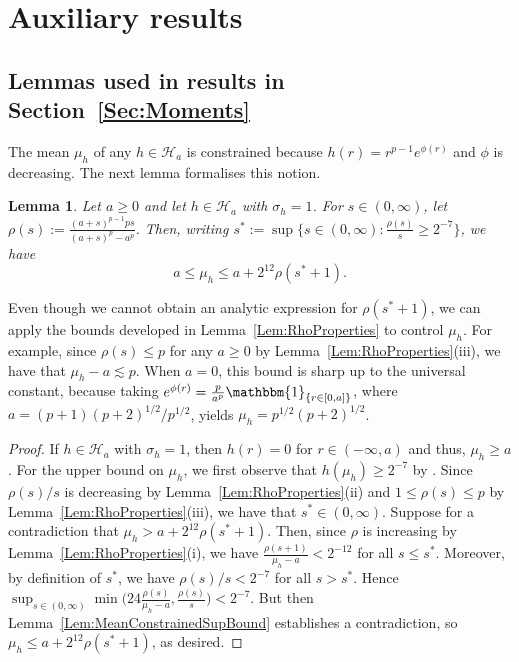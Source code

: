 \documentclass[a4paper,12pt]{article}
\newtheorem{lemma}[theorem]{Lemma}
\newenvironment{remark}[1][Remark:]{\begin{trivlist}
\item[\hskip \labelsep {\bfseries #1}]}{\end{trivlist}}
\begin{document}
\section{Auxiliary results}

\subsection{Lemmas used in results in Section~\ref{Sec:Moments}} 

The mean $\mu_h$ of any $h \in \mathcal{H}_a$ is constrained because $h(r) = r^{p-1}e^{\phi(r)}$ and $\phi$ is decreasing. The next lemma formalises this notion.
\begin{lemma}
  \label{Lem:UnitVarianceMeanBound}
  Let $a \geq 0$ and let $h \in \mathcal{H}_{a}$ with $\sigma_h = 1$.  For $s \in (0,\infty)$, let $\rho(s) := \frac{(a + s)^{p-1} p s}{(a + s)^p - a^p}$.  Then, writing $s^* := \sup \{ s \in (0,\infty) : \frac{\rho(s)}{s} \geq 2^{-7} \}$, we have
\[
a \leq \mu_h \leq a + 2^{12} \rho(s^*+1).
\]
\end{lemma}
\begin{remark}
Even though we cannot obtain an analytic expression for $\rho(s^*+1)$, we can apply the bounds developed in Lemma~\ref{Lem:RhoProperties} to control $\mu_h$.  For example, since $\rho(s) \leq p$ for any $a \geq 0$ by Lemma~\ref{Lem:RhoProperties}(iii), we have that $\mu_h - a \lesssim p$. When $a = 0$, this bound is sharp up to the universal constant, because taking $e^{\phi(r)} = \frac{p}{a^p}\mathbbm{1}_{\{r \in [0,a]\}}$, where $a = (p+1)(p+2)^{1/2}/p^{1/2}$, yields $\mu_h = p^{1/2}(p+2)^{1/2}$. 
\end{remark}
\begin{proof}
If $h \in \mathcal{H}_{a}$ with $\sigma_h = 1$, then $h(r) = 0$ for $r \in (-\infty, a)$ and thus, $\mu_h \geq a$.  For the upper bound on $\mu_h$, we first observe that $h(\mu_h) \geq 2^{-7}$ by \citet[][Theorem~5.14(d)]{lovasz2007geometry}.  Since $\rho(s)/s$ is decreasing by Lemma~\ref{Lem:RhoProperties}(ii) and $1 \leq \rho(s) \leq p$ by Lemma~\ref{Lem:RhoProperties}(iii), we have that $s^* \in (0,\infty)$.  Suppose for a contradiction that $\mu_h > a + 2^{12}\rho(s^*+1)$.  Then, since $\rho$ is increasing  by Lemma~\ref{Lem:RhoProperties}(i), we have $\frac{\rho(s + 1)}{\mu_h - a} < 2^{-12}$ for all $s \leq s^*$. Moreover, by definition of $s^*$, we have $\rho(s)/s < 2^{-7}$ for all $s > s^*$. Hence $\sup_{s \in (0,\infty)} \min \bigl( 24 \frac{\rho(s)}{\mu_h - a}, \frac{\rho(s)}{s} \bigr) < 2^{-7}$.  But then Lemma~\ref{Lem:MeanConstrainedSupBound} establishes a contradiction, so $\mu_h \leq a + 2^{12} \rho(s^*+1)$, as desired.  
\end{proof}
\end{document}
